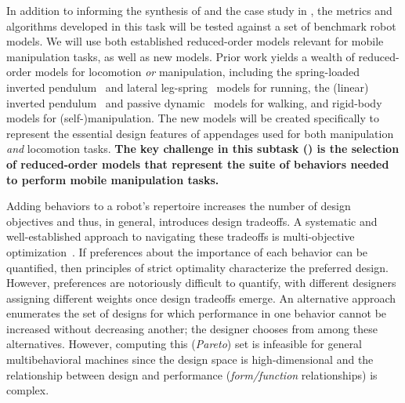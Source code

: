 \documentclass[11pt]{article}
\begin{document}

In addition to informing the synthesis of  and the case study in , the metrics and algorithms developed in this task will be tested against a set of benchmark robot models. 
We will use both established reduced-order models relevant for mobile manipulation tasks,
as well as new models. 
Prior work yields a wealth of reduced-order models for locomotion \emph{or} manipulation,
including 
the spring-loaded inverted pendulum~\cite{Blickhan1993-sr} 
and 
lateral leg-spring~\cite{Schmitt2000-eu}
models for running, 
the (linear) inverted pendulum~\cite{Miura1984-hb}
and
passive dynamic~\cite{Collins2005-sc, McGeer1990-zb}
models for walking,
and 
rigid-body~\cite{paper:libby_tail_2016, Johnson2013-ks}
models for (self-)manipulation.
The new models will be created specifically to represent the essential design features of appendages used for both manipulation \emph{and} locomotion tasks.
{\bf The key challenge in this subtask () is the selection of reduced-order models that represent the suite of behaviors needed to perform mobile manipulation tasks.}



Adding behaviors to a robot's repertoire increases the number of design objectives and thus, in general, introduces design tradeoffs. 
A systematic and well-established approach to navigating these tradeoffs is multi-objective optimization~. 
If preferences about the importance of each behavior can be quantified, then principles of strict optimality characterize the preferred design. 
However, preferences are notoriously difficult to quantify, with different designers assigning different weights once design tradeoffs emerge. 
An alternative approach enumerates the set of  designs for which performance in one behavior cannot be increased without decreasing another; the designer chooses from among these alternatives. 
However, computing this (\emph{Pareto}) set is infeasible for general multibehavioral machines since 
the design space is high-dimensional
and
the relationship between design and performance (\emph{form/function} relationships) is complex.
\end{document}
